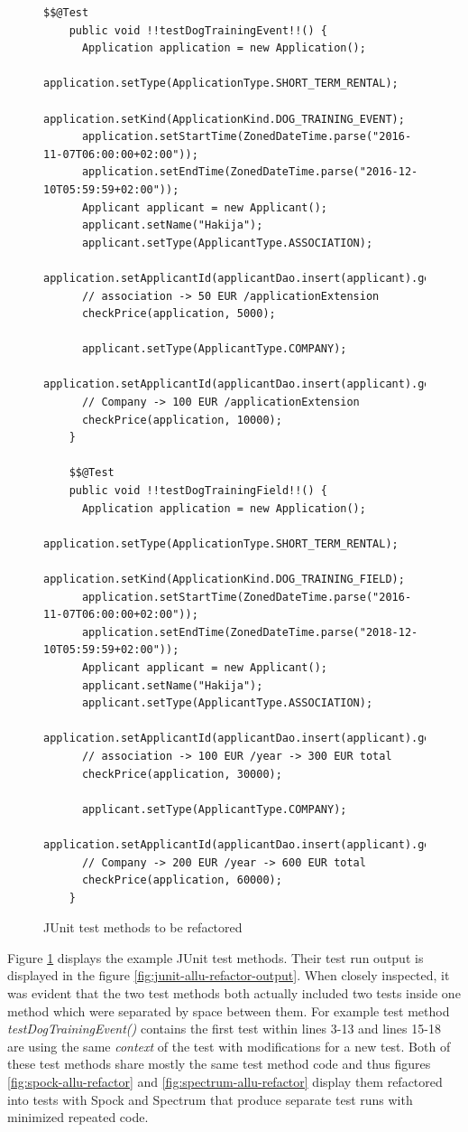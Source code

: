     \begin{figure}[H]
      \begin{lstlisting}[style=java]
    $$@Test
    public void !!testDogTrainingEvent!!() {
      Application application = new Application();
      application.setType(ApplicationType.SHORT_TERM_RENTAL);
      application.setKind(ApplicationKind.DOG_TRAINING_EVENT);
      application.setStartTime(ZonedDateTime.parse("2016-11-07T06:00:00+02:00"));
      application.setEndTime(ZonedDateTime.parse("2016-12-10T05:59:59+02:00"));
      Applicant applicant = new Applicant();
      applicant.setName("Hakija");
      applicant.setType(ApplicantType.ASSOCIATION);
      application.setApplicantId(applicantDao.insert(applicant).getId());
      // association -> 50 EUR /applicationExtension
      checkPrice(application, 5000);

      applicant.setType(ApplicantType.COMPANY);
      application.setApplicantId(applicantDao.insert(applicant).getId());
      // Company -> 100 EUR /applicationExtension
      checkPrice(application, 10000);
    }

    $$@Test
    public void !!testDogTrainingField!!() {
      Application application = new Application();
      application.setType(ApplicationType.SHORT_TERM_RENTAL);
      application.setKind(ApplicationKind.DOG_TRAINING_FIELD);
      application.setStartTime(ZonedDateTime.parse("2016-11-07T06:00:00+02:00"));
      application.setEndTime(ZonedDateTime.parse("2018-12-10T05:59:59+02:00"));
      Applicant applicant = new Applicant();
      applicant.setName("Hakija");
      applicant.setType(ApplicantType.ASSOCIATION);
      application.setApplicantId(applicantDao.insert(applicant).getId());
      // association -> 100 EUR /year -> 300 EUR total
      checkPrice(application, 30000);

      applicant.setType(ApplicantType.COMPANY);
      application.setApplicantId(applicantDao.insert(applicant).getId());
      // Company -> 200 EUR /year -> 600 EUR total
      checkPrice(application, 60000);
    }
        \end{lstlisting}
        \caption{JUnit test methods to be refactored}
        \label{fig:junit-allu-refactor}

    \end{figure}

    Figure \ref{fig:junit-allu-refactor} displays the example JUnit test methods. Their test run output is displayed in the
    figure \ref{fig:junit-allu-refactor-output}. When closely inspected, it was evident
    that the two test methods both actually included two tests inside one method which were separated by space between
    them. For example test method \textit{testDogTrainingEvent()} contains the first test within lines 3-13 and lines 15-18 are using
    the same \textit{context} of the test with modifications for a new test.
    Both of these test methods share mostly the same test method code and thus figures \ref{fig:spock-allu-refactor} and
    \ref{fig:spectrum-allu-refactor} display them refactored
    into tests with Spock and Spectrum that produce separate test runs with minimized repeated code.


